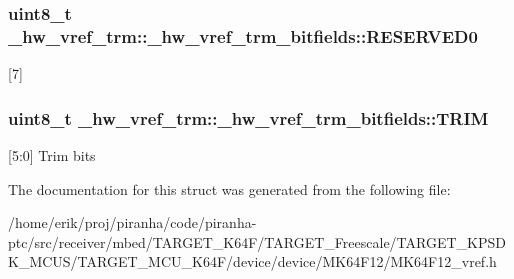 \subsubsection[{\texorpdfstring{R\+E\+S\+E\+R\+V\+E\+D0}{RESERVED0}}]{\setlength{\rightskip}{0pt plus 5cm}uint8\+\_\+t \+\_\+hw\+\_\+vref\+\_\+trm\+::\+\_\+hw\+\_\+vref\+\_\+trm\+\_\+bitfields\+::\+R\+E\+S\+E\+R\+V\+E\+D0}\hypertarget{struct__hw__vref__trm_1_1__hw__vref__trm__bitfields_a6d0a0fecf9bd54d757fd30c438ff3dbb}{}\label{struct__hw__vref__trm_1_1__hw__vref__trm__bitfields_a6d0a0fecf9bd54d757fd30c438ff3dbb}
\mbox{[}7\mbox{]} 
\subsubsection[{\texorpdfstring{T\+R\+IM}{TRIM}}]{\setlength{\rightskip}{0pt plus 5cm}uint8\+\_\+t \+\_\+hw\+\_\+vref\+\_\+trm\+::\+\_\+hw\+\_\+vref\+\_\+trm\+\_\+bitfields\+::\+T\+R\+IM}\hypertarget{struct__hw__vref__trm_1_1__hw__vref__trm__bitfields_a4ba10cc47cc2f260570e053bd7e61294}{}\label{struct__hw__vref__trm_1_1__hw__vref__trm__bitfields_a4ba10cc47cc2f260570e053bd7e61294}
\mbox{[}5\+:0\mbox{]} Trim bits 

The documentation for this struct was generated from the following file\+:\begin{DoxyCompactItemize}
\item 
/home/erik/proj/piranha/code/piranha-\/ptc/src/receiver/mbed/\+T\+A\+R\+G\+E\+T\+\_\+\+K64\+F/\+T\+A\+R\+G\+E\+T\+\_\+\+Freescale/\+T\+A\+R\+G\+E\+T\+\_\+\+K\+P\+S\+D\+K\+\_\+\+M\+C\+U\+S/\+T\+A\+R\+G\+E\+T\+\_\+\+M\+C\+U\+\_\+\+K64\+F/device/device/\+M\+K64\+F12/M\+K64\+F12\+\_\+vref.\+h\end{DoxyCompactItemize}
